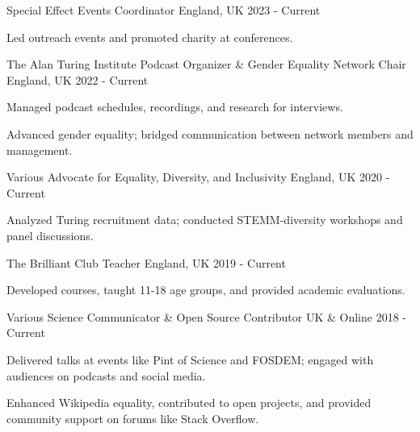 
\begin{cventries}

\cventry
{Special Effect}
{Events Coordinator}
{England, UK}
{2023 - Current}
{
  \begin{cvitems}
    \item{Led outreach events and promoted charity at conferences.}
  \end{cvitems}
}

\cventry
{The Alan Turing Institute}
{Podcast Organizer \& Gender Equality Network Chair}
{England, UK}
{2022 - Current}
{
  \begin{cvitems}
    \item{Managed podcast schedules, recordings, and research for interviews.}
    \item{Advanced gender equality; bridged communication between network members and management.}
  \end{cvitems}
}

\cventry
{Various}
{Advocate for Equality, Diversity, and Inclusivity}
{England, UK}
{2020 - Current}
{
  \begin{cvitems}
    \item{Analyzed Turing recruitment data; conducted STEMM-diversity workshops and panel discussions.}
  \end{cvitems}
}

\cventry
{The Brilliant Club}
{Teacher}
{England, UK}
{2019 - Current}
{
  \begin{cvitems}
    \item{Developed courses, taught 11-18 age groups, and provided academic evaluations.}
  \end{cvitems}
}

\cventry
{Various}
{Science Communicator \& Open Source Contributor}
{UK \& Online}
{2018 - Current}
{
  \begin{cvitems}
    \item{Delivered talks at events like Pint of Science and FOSDEM; engaged with audiences on podcasts and social media.}
    \item{Enhanced Wikipedia equality, contributed to open projects, and provided community support on forums like Stack Overflow.}
  \end{cvitems}
}

\end{cventries}
